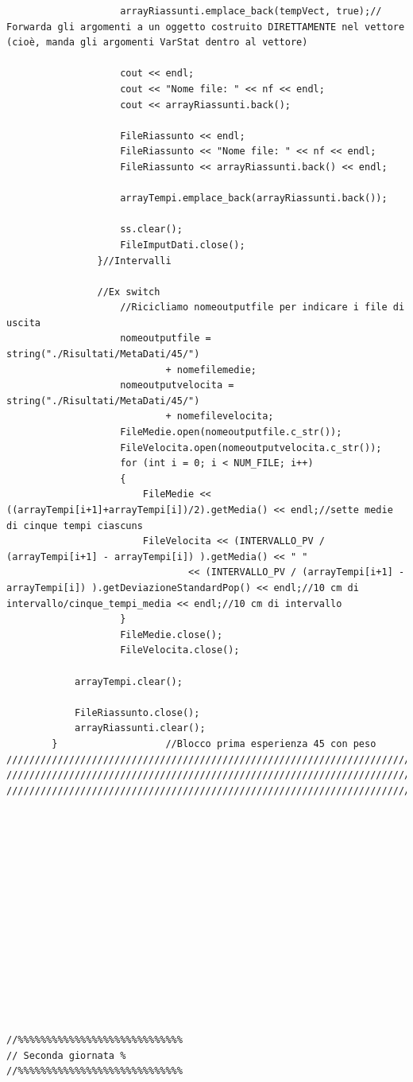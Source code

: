 \documentclass[12pt]{article} %
\begin{document}
\begin{verbatim}
					arrayRiassunti.emplace_back(tempVect, true);// Forwarda gli argomenti a un oggetto costruito DIRETTAMENTE nel vettore (cioè, manda gli argomenti VarStat dentro al vettore)

					cout << endl;
					cout << "Nome file: " << nf << endl;
					cout << arrayRiassunti.back();

					FileRiassunto << endl;
					FileRiassunto << "Nome file: " << nf << endl;
					FileRiassunto << arrayRiassunti.back() << endl;

					arrayTempi.emplace_back(arrayRiassunti.back());

					ss.clear();
					FileImputDati.close();
				}//Intervalli

				//Ex switch
					//Ricicliamo nomeoutputfile per indicare i file di uscita
					nomeoutputfile = string("./Risultati/MetaDati/45/")
							+ nomefilemedie;
					nomeoutputvelocita = string("./Risultati/MetaDati/45/")
							+ nomefilevelocita;
					FileMedie.open(nomeoutputfile.c_str());
					FileVelocita.open(nomeoutputvelocita.c_str());
					for (int i = 0; i < NUM_FILE; i++)
					{
						FileMedie << ((arrayTempi[i+1]+arrayTempi[i])/2).getMedia() << endl;//sette medie di cinque tempi ciascuns
						FileVelocita << (INTERVALLO_PV / (arrayTempi[i+1] - arrayTempi[i]) ).getMedia() << " "
								<< (INTERVALLO_PV / (arrayTempi[i+1] - arrayTempi[i]) ).getDeviazioneStandardPop() << endl;//10 cm di intervallo/cinque_tempi_media << endl;//10 cm di intervallo
					}
					FileMedie.close();
					FileVelocita.close();

			arrayTempi.clear();

			FileRiassunto.close();
			arrayRiassunti.clear();
		}					//Blocco prima esperienza 45 con peso
///////////////////////////////////////////////////////////////////////////////////////////////////
///////////////////////////////////////////////////////////////////////////////////////////////////
///////////////////////////////////////////////////////////////////////////////////////////////////















//%%%%%%%%%%%%%%%%%%%%%%%%%%%%%
// Seconda giornata %
//%%%%%%%%%%%%%%%%%%%%%%%%%%%%%


\end{verbatim}
\end{document}
